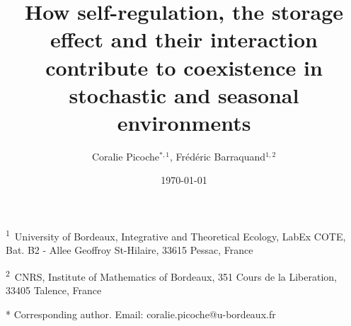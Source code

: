 \documentclass[a4paper,12pt]{article}
\begin{document}
\title{\Huge How self-regulation, the storage effect and their interaction contribute
to coexistence in stochastic and seasonal environments}
\date{\today}
\author{\Large Coralie Picoche$^{*,1}$, Fr\'ed\'eric Barraquand$^{1,2}$}

\maketitle
 
{\large{}}\textsuperscript{{\large{}1}}{\large{}~University of
Bordeaux, Integrative and Theoretical Ecology, LabEx COTE, Bat. B2
- Allee Geoffroy St-Hilaire, 33615 Pessac, France \bigskip{}
}{\large\par}

{\large{}}\textsuperscript{{\large{}2}}{\large{}~CNRS, Institute
of Mathematics of Bordeaux, 351 Cours de la Liberation, 33405 Talence,
France}{\large\par}

{\large{}\bigskip{}
}{\large\par}

{\large{}\bigskip{}
}{\large\par}

{\large{}\bigskip{}
}{\large\par}

{\large{}\bigskip{}
}{\large\par}

{*} Corresponding author. Email: coralie.picoche@u-bordeaux.fr
 
\linenumbers
\pagebreak{}
\end{document}
